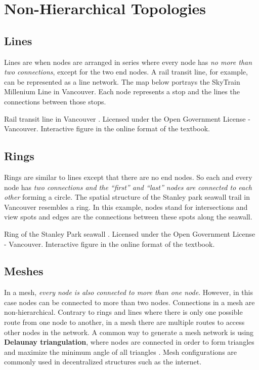 \documentclass[
]{book}
\begin{document}
\section{Non-Hierarchical Topologies}\label{non-hierarchical-topologies}

\subsection{Lines}\label{lines}

Lines are when nodes are arranged in series where every node has \emph{no more than two connections}, except for the two end nodes. A rail transit line, for example, can be represented as a line network. The map below portrays the SkyTrain Millenium Line in Vancouver. Each node represents a stop and the lines the connections between those stops.

\label{fig:8-vancouver-rail-transit}Rail transit line in Vancouver \citep{city_of_vancouver_open_nodate}. Licensed under the Open Government License - Vancouver. Interactive figure in the online format of the textbook.

\subsection{Rings}\label{rings}

Rings are similar to lines except that there are no end nodes. So each and every node has \emph{two connections and the ``first'' and ``last'' nodes are connected to each other} forming a circle. The spatial structure of the Stanley park seawall trail in Vancouver resembles a ring. In this example, nodes stand for intersections and view spots and edges are the connections between these spots along the seawall.

\label{fig:8-stanley-park-seawall}Ring of the Stanley Park seawall \citep{city_of_vancouver_open_nodate}. Licensed under the Open Government License - Vancouver. Interactive figure in the online format of the textbook.

\subsection{Meshes}\label{meshes}

In a mesh, \emph{every node is also connected to more than one node}. However, in this case nodes can be connected to more than two nodes. Connections in a mesh are non-hierarchical. Contrary to rings and lines where there is only one possible route from one node to another, in a mesh there are multiple routes to access other nodes in the network. A common way to generate a mesh network is using \textbf{Delaunay triangulation}, where nodes are connected in order to form triangles and maximize the minimum angle of all triangles \citep{wikimedia_delaunay_2021}. Mesh configurations are commonly used in decentralized structures such as the internet.
\end{document}
